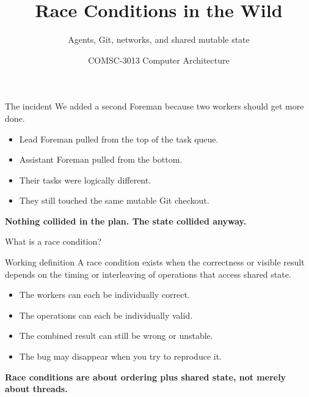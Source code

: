 \documentclass{beamer}
\title{Race Conditions in the Wild}
\subtitle{Agents, Git, networks, and shared mutable state}
\author{COMSC-3013 Computer Architecture}
\date{}
\begin{document}
\begin{frame}\titlepage\end{frame}

\begin{frame}{The incident}
\Large We added a second Foreman because two workers should get more done.

\vspace{1em}
\normalsize
\begin{itemize}
  \item Lead Foreman pulled from the top of the task queue.
  \item Assistant Foreman pulled from the bottom.
  \item Their tasks were logically different.
  \item They still touched the same mutable Git checkout.
\end{itemize}

\vspace{0.7em}
\centering
\textbf{Nothing collided in the plan. The state collided anyway.}
\end{frame}

\begin{frame}{What is a race condition?}
\begin{block}{Working definition}
A race condition exists when the correctness or visible result depends on the timing or interleaving of operations that access shared state.
\end{block}

\begin{itemize}
  \item The workers can each be individually correct.
  \item The operations can each be individually valid.
  \item The combined result can still be wrong or unstable.
  \item The bug may disappear when you try to reproduce it.
\end{itemize}

\vspace{0.5em}
\textbf{Race conditions are about ordering plus shared state, not merely about threads.}
\end{frame}
\end{document}
